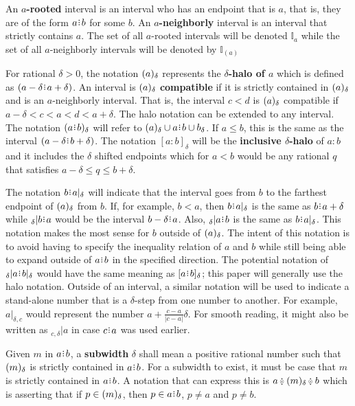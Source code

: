 \documentclass[12pt]{article}
\begin{document}
An \textbf{$a$-rooted} interval is an interval who has an endpoint that is $a$, that is, they are of the form $a\rint b$ for some $b$. An  \textbf{$a$-neighborly} interval is an interval that strictly contains $a$. The set of all $a$-rooted intervals will be denoted $\mathbb{I}_a$ while the set of all $a$-neighborly intervals will be denoted by $\mathbb{I}_{(a)}$

For rational $\delta > 0$, the notation $(a)_{\delta}$ represents the \textbf{$\delta$-halo of $a$} which is defined as $(a -\delta \rint  a+ \delta)$. An interval is $(a)_{\delta}$ \textbf{compatible }if it is strictly contained in $(a)_{\delta}$ and is an $a$-neighborly interval. That is, the interval $c \lt d$ is $(a)_{\delta}$ compatible if $a- \delta < c < a < d < a+ \delta$. The halo notation can be extended to any interval. The notation $\halo{a\rint b}$ will refer to $\halo{a} \cup a\rint b \cup b_\delta$. If $a \leq b$, this is the same as the interval $(a-\delta\rint b+\delta)$. The notation $[a:b]_{\delta}$ will be the \textbf{inclusive $\delta$-halo} of $a:b$ and it includes the $\delta$ shifted endpoints which for $a \lt b$ would be any rational $q$ that satisfies $a - \delta \leq q \leq b+ \delta$. 


The notation $b\rint a|_\delta$ will indicate that the interval goes from $b$ to the farthest endpoint of $(a)_{\delta}$ from $b$. If, for example, $b < a$, then $b\rint a|_\delta$ is the same as $b\rint a+\delta$ while ${}_\delta|b\rint a$ would be the interval $b-\delta\rint a$. Also, ${}_\delta|a \rint  b$ is the same as $b\rint a|_\delta$. This notation makes the most sense for $b$ outside of $(a)_{\delta}$. The intent of this notation is to avoid having to specify the inequality relation of $a$ and $b$ while still being able to expand outside of $a\rint b$ in the specified direction. The potential notation of ${}_\delta | a\rint b|_\delta$ would have the same meaning as $[a\rint b]_\delta$; this paper will generally use the halo notation. Outside of an interval, a similar notation will be used to indicate a stand-alone number that is a $\delta$-step from one number to another. For example, $a|_{\delta,c}$ would represent the number $a + \frac{c-a}{|c-a|}\delta$. For smooth reading, it might also be written as ${}_{c, \delta}|a$ in case $c \rint a$ was used earlier. 

Given $m$ in $a \rint  b$, a \textbf{subwidth} $\delta$ shall mean a positive rational number such that $(m)_{\delta}$ is strictly contained in $a\rint b$. For a subwidth to exist, it must be case that $m$ is strictly contained in $a\rint b$. A notation that can express this is $a \betneq \halo{m} \betneq b$ which is asserting that if $p \in (m)_{\delta}$, then $p \in a\rint b$, $p \neq a$ and $p \neq b$. 
\end{document}
